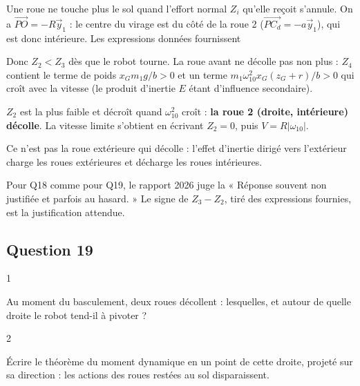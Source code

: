 \documentclass[11pt,a4paper]{article}
\newcommand{\equationajustee}[1]{%
  \sbox{\boiteequation}{$\displaystyle #1$}%
  \ifdim\wd\boiteequation>\linewidth
    \[\resizebox{\linewidth}{!}{\usebox{\boiteequation}}\]%
  \else
    \[#1\]%
  \fi}
\begin{document}
Une roue ne touche plus le sol quand l'effort normal \(Z_i\) qu'elle reçoit s'annule. On a \(\overrightarrow{PO} = -R\vec y_1\) : le centre du virage est du côté de la roue 2 (\(\overrightarrow{PC_d} = -a\vec y_1\)), qui est donc intérieure. Les expressions données fournissent

\equationajustee{Z_3 - Z_2 = \frac{m_1\,\omega_{10}^2\,(z_G + r)\,R}{a} > 0}

Donc \(Z_2 < Z_3\) dès que le robot tourne. La roue avant ne décolle pas non plus : \(Z_4\) contient le terme de poids \(x_G m_1 g/b > 0\) et un terme \(m_1\omega_{10}^2 x_G(z_G + r)/b > 0\) qui croît avec la vitesse (le produit d'inertie \(E\) étant d'influence secondaire).

\(Z_2\) est la plus faible et décroît quand \(\omega_{10}^2\) croît : \textbf{la roue 2 (droite, intérieure) décolle}. La vitesse limite s'obtient en écrivant \(\boxed{Z_2 = 0}\), puis \(V = R|\omega_{10}|\).

\begin{piege}

Ce n'est pas la roue extérieure qui décolle : l'effet d'inertie dirigé vers l'extérieur charge les roues extérieures et décharge les roues intérieures.

\end{piege}

\begin{jury}

Pour Q18 comme pour Q19, le rapport 2026 juge la « Réponse souvent non justifiée et parfois au hasard. » Le signe de \(Z_3 - Z_2\), tiré des expressions fournies, est la justification attendue.

\end{jury}

\hypertarget{question-19}{%
\subsection{Question 19}\label{question-19}}

\begin{indication}{1}

Au moment du basculement, deux roues décollent : lesquelles, et autour de quelle droite le robot tend-il à pivoter ?

\end{indication}

\begin{indication}{2}

Écrire le théorème du moment dynamique en un point de cette droite, projeté sur sa direction : les actions des roues restées au sol disparaissent.

\end{indication}
\end{document}
